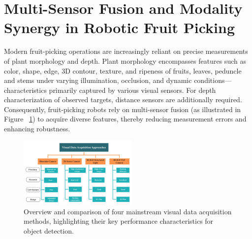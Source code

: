\documentclass[a4paper,fleqn]{cas-dc}
\begin{document}
\section{Multi-Sensor Fusion and Modality Synergy in Robotic Fruit Picking}

Modern fruit-picking operations are increasingly reliant on precise measurements of plant morphology and depth. Plant morphology encompasses features such as color, shape, edge, 	3D contour, texture, and ripeness of fruits, leaves, peduncle and stems under varying illumination, occlusion, and dynamic conditions—characteristics primarily captured by various visual sensors. For depth characterization of observed targets, distance sensors are additionally required. 
Consequently, fruit-picking robots rely on multi-sensor fusion (as illustrated in Figure ~\ref{fig:camera}) to acquire diverse features, thereby reducing measurement errors and enhancing robustness.
\begin{figure}[hbtp]
\centering
\includegraphics[width=0.52\textwidth]{fig_camera1.png}
\caption{Overview and comparison of four mainstream visual data acquisition methods, highlighting their key performance characteristics for object detection.}
\label{fig:camera}
\end{figure}
\end{document}
